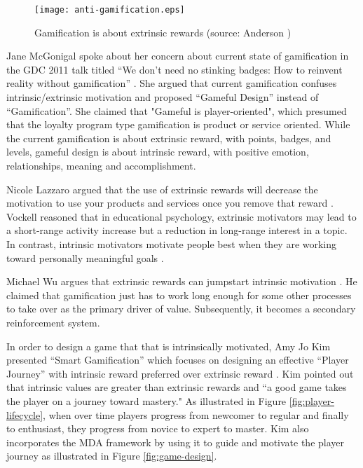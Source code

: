 \begin{figure}[ht!]
	\centering
		\texttt{[image: anti-gamification.eps]}
		\caption{Gamification is about extrinsic rewards (source: Anderson \cite {anderson2011})}
		\label{fig:anti-gamification}
\end{figure}

Jane McGonigal spoke about her concern about current state of gamification in the GDC 2011 talk titled ``We don't need no stinking badges: How to reinvent reality without gamification'' \cite {mcgonigal2011}. She argued that current gamification confuses intrinsic/extrinsic motivation and proposed ``Gameful Design'' instead of ``Gamification''. She claimed that "Gameful is player-oriented", which presumed that the loyalty program type gamification is product or service oriented. While the current gamification is about extrinsic reward, with points, badges, and levels, gameful design is about intrinsic reward, with positive emotion, relationships, meaning and accomplishment.

Nicole Lazzaro argued that the use of extrinsic rewards will decrease the motivation to use your products and services once you remove that reward \cite {Lazzaro2011}. Vockell reasoned that in educational psychology, extrinsic motivators may lead to a short-range activity increase but a reduction in long-range interest in a topic. In contrast, intrinsic motivators motivate people best when they are working toward personally meaningful goals \cite{vockell2004educational}. 

Michael Wu argues that extrinsic rewards can jumpstart intrinsic motivation  \cite {WuSustainable2011}. He claimed that gamification just has to work long enough for some other processes to take over as the primary driver of value. Subsequently, it becomes a secondary reinforcement system. 

In order to design a game that that is intrinsically motivated, Amy Jo Kim presented ``Smart Gamification'' which focuses on designing an effective ``Player Journey'' with intrinsic reward preferred over extrinsic reward \cite {Kim2010}. Kim pointed out that intrinsic values are greater than extrinsic rewards and ``a good game takes the player on a journey toward mastery." As illustrated in Figure \autoref{fig:player-lifecycle}, when over time players progress from newcomer to regular and finally to enthusiast, they progress from novice to expert to master. Kim also incorporates the MDA framework \cite {hunicke2004mda} by using it to guide and motivate the player journey as illustrated in Figure \autoref{fig:game-design}.

